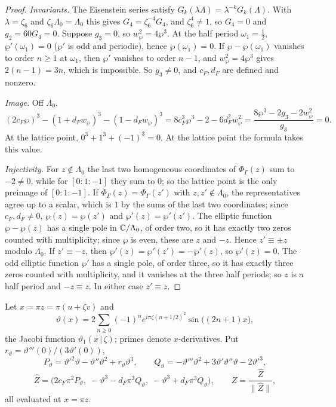 \begin{proof}
\emph{Invariants.} The Eisenstein series satisfy $G_k(\lambda\Lambda)=\lambda^{-k}G_k(\Lambda)$. With $\lambda=\zeta_6$ and
$\zeta_6\Lambda_0=\Lambda_0$ this gives $G_4=\zeta_6^{-4}G_4$, and $\zeta_6^4\ne1$, so $G_4=0$ and $g_2=60G_4=0$. Suppose
$g_3=0$, so $w_\wp^2=4\wp^3$. At the half period $\omega_1=\frac12$, $\wp'(\omega_1)=0$ ($\wp'$ is odd and periodic), hence
$\wp(\omega_1)=0$. If $\wp-\wp(\omega_1)$ vanishes to order $n\ge1$ at $\omega_1$, then $\wp'$ vanishes to order $n-1$, and
$w_\wp^2=4\wp^3$ gives $2(n-1)=3n$, which is impossible. So $g_3\ne0$, and $c_F,d_F$ are defined and nonzero.

\emph{Image.} Off $\Lambda_0$,
\[
 (2c_F\wp)^3-(1+d_Fw_\wp)^3-(1-d_Fw_\wp)^3=8c_F^3\wp^3-2-6d_F^2w_\wp^2=\frac{8\wp^3-2g_3-2w_\wp^2}{g_3}=0 .
\]
At the lattice point, $0^3+1^3+(-1)^3=0$. At the lattice point the formula takes this value.

\emph{Injectivity.} For $z\notin\Lambda_0$ the last two homogeneous coordinates of $\Phi_\Gamma(z)$ sum to $-2\ne0$, while
for $[0:1:-1]$ they sum to $0$; so the lattice point is the only preimage of $[0:1:-1]$. If $\Phi_\Gamma(z)=\Phi_\Gamma(z')$ with
$z,z'\notin\Lambda_0$, the representatives agree up to a scalar, which is $1$ by the sums of the last two coordinates;
since $c_F,d_F\ne0$, $\wp(z)=\wp(z')$ and $\wp'(z)=\wp'(z')$. The elliptic function $\wp-\wp(z)$ has a single pole in
$\mathbb{C}/\Lambda_0$, of order two, so it has exactly two zeros counted with multiplicity; since $\wp$ is even, these are $z$ and
$-z$. Hence $z'\equiv\pm z$ modulo $\Lambda_0$. If $z'\equiv-z$, then $\wp'(z)=\wp'(z')=-\wp'(z)$, so $\wp'(z)=0$. The odd
elliptic function $\wp'$ has a single pole, of order three, so it has exactly three zeros counted with multiplicity, and it
vanishes at the three half periods; so $z$ is a half period and $-z\equiv z$. In either case $z'\equiv z$.
\end{proof}

\begin{definition}\label{def:fer-theta}
Let $x=\pi z=\pi(u+\zeta v)$ and
\[
 \vartheta(x)=2\sum_{n\ge0}(-1)^ne^{i\pi\zeta(n+1/2)^2}\sin\big((2n+1)x\big),
\]
the Jacobi function $\vartheta_1(x\,|\,\zeta)$; primes denote $x$-derivatives. Put
$r_\vartheta=\vartheta'''(0)/(3\vartheta'(0))$,
\[
 P_\vartheta=\vartheta'^2\vartheta-\vartheta''\vartheta^2+r_\vartheta\vartheta^3,\qquad
 Q_\vartheta=-\vartheta'''\vartheta^2+3\vartheta'\vartheta''\vartheta-2\vartheta'^3,
\]
\[
 \hat Z=\big(2c_F\pi^2P_\vartheta,\;-\vartheta^3-d_F\pi^3Q_\vartheta,\;-\vartheta^3+d_F\pi^3Q_\vartheta\big),\qquad
 Z=\frac{\hat Z}{\|\hat Z\|},
\]
all evaluated at $x=\pi z$.
\end{definition}

